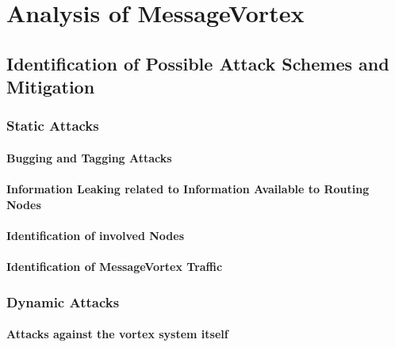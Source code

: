 
\part{Analysis of MessageVortex}

\chapter{Identification of Possible Attack Schemes and Mitigation\label{sec:attacks}}
\section{Static Attacks}
\subsection{Bugging and Tagging Attacks}
\subsection{Information Leaking related to Information Available to Routing Nodes}
\subsection{Identification of involved Nodes}
\subsection{Identification of MessageVortex Traffic}
\section{Dynamic Attacks}
\subsection{Attacks against the vortex system itself}
